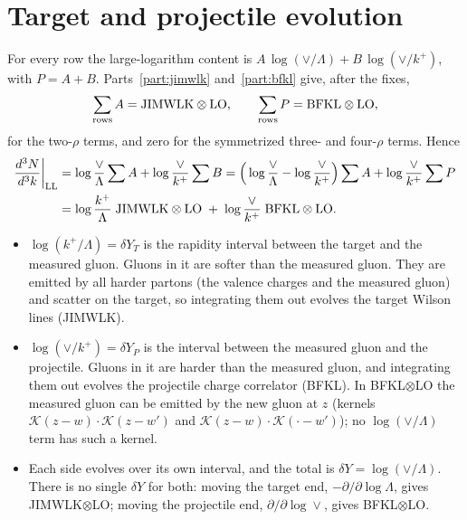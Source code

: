 \documentclass[10pt]{article}
\numberwithin{equation}{section}
\newcommand{\KK}{\mathcal K}
\begin{document}
\section{Target and projectile evolution}\label{sec:LL}
For every row the large-logarithm content is $A\,\log(\vee/\Lambda)+B\,\log(\vee/k^+)$, with $P=A+B$. Parts~\ref{part:jimwlk} and~\ref{part:bfkl} give, after the fixes,
\begin{equation}
\sum_{\rm rows}A=\text{JIMWLK}\otimes\text{LO},\qquad\sum_{\rm rows}P=\text{BFKL}\otimes\text{LO},
\end{equation}
for the two-$\rho$ terms, and zero for the symmetrized three- and four-$\rho$ terms. Hence
\begin{align}
\frac{d^3N}{d^3k}\bigg|_{\rm LL}&=\log\frac{\vee}{\Lambda}\sum A+\log\frac{\vee}{k^+}\sum B
=\Big(\log\frac{\vee}{\Lambda}-\log\frac{\vee}{k^+}\Big)\sum A+\log\frac{\vee}{k^+}\sum P\notag\\
&=\log\frac{k^+}{\Lambda}\;\text{JIMWLK}\otimes\text{LO}\;+\;\log\frac{\vee}{k^+}\;\text{BFKL}\otimes\text{LO}.
\label{eq:LLfinal}
\end{align}
\begin{itemize}
\item $\log(k^+/\Lambda)=\delta Y_T$ is the rapidity interval between the target and the measured gluon. Gluons in it are softer than the measured gluon. They are emitted by all harder partons (the valence charges and the measured gluon) and scatter on the target, so integrating them out evolves the target Wilson lines (JIMWLK).
\item $\log(\vee/k^+)=\delta Y_P$ is the interval between the measured gluon and the projectile. Gluons in it are harder than the measured gluon, and integrating them out evolves the projectile charge correlator (BFKL). In BFKL$\otimes$LO the measured gluon can be emitted by the new gluon at $z$ (kernels $\KK(z-w)\cdot\KK(z-w')$ and $\KK(z-w)\cdot\KK(\cdot-w')$); no $\log(\vee/\Lambda)$ term has such a kernel.
\item Each side evolves over its own interval, and the total is $\delta Y=\log(\vee/\Lambda)$. There is no single $\delta Y$ for both: moving the target end, $-\partial/\partial\log\Lambda$, gives JIMWLK$\otimes$LO; moving the projectile end, $\partial/\partial\log\vee$, gives BFKL$\otimes$LO.
\end{itemize}
\end{document}
